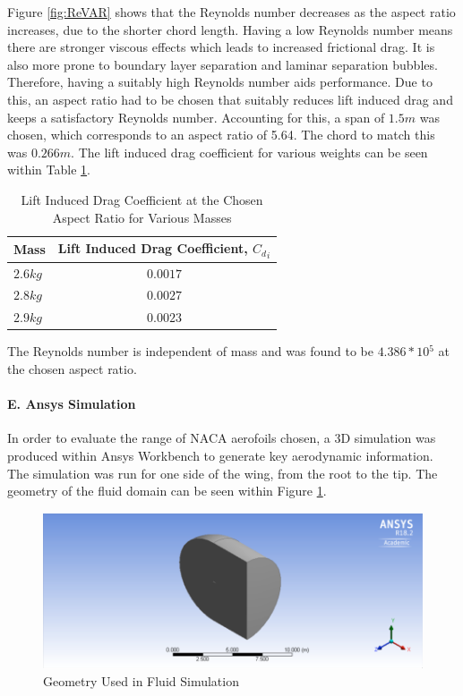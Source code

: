 \documentclass[12pt]{article}
\begin{document}
\noindent Figure \ref{fig:ReVAR} shows that the Reynolds number decreases as the aspect ratio increases, due to the shorter chord length. Having a low Reynolds number means there are stronger viscous effects which leads to increased frictional drag. It is also more prone to boundary layer separation and laminar separation bubbles. Therefore, having a suitably high Reynolds number aids performance. Due to this, an aspect ratio had to be chosen that suitably reduces lift induced drag and keeps a satisfactory Reynolds number. Accounting for this, a span of $1.5m$ was chosen, which corresponds to an aspect ratio of 5.64. The chord to match this was $0.266m$. The lift induced drag coefficient for various weights can be seen within Table \ref{table:indrc}. \\

\begin{table}[h]
    \centering
    \begin{tabular}{|l|c|}
        \hline
        \textbf{Mass} & \textbf{Lift Induced Drag Coefficient, $C{{_d}_i}$} \\
        \hline 
        $2.6kg$ & $0.0017$ \\
        \hline 
        $2.8kg$ & $0.0027$ \\
        \hline 
        $2.9kg$ & $0.0023$ \\
        \hline
    \end{tabular}
    \caption{Lift Induced Drag Coefficient at the Chosen Aspect Ratio for Various Masses}
    \label{table:indrc}
\end{table}

\noindent The Reynolds number is independent of mass and was found to be $4.386*10{^5}$ at the chosen aspect ratio. \\

\paragraph{E. Ansys Simulation} In order to evaluate the range of NACA aerofoils chosen, a 3D simulation was produced within Ansys Workbench to generate key aerodynamic information. The simulation was run for one side of the wing, from the root to the tip. The geometry of the fluid domain can be seen within Figure \ref{fig:cfdgeom}. \\

\begin{figure}[H]
\includegraphics[width=18cm, scale=1]{cfdgeometry.png}
\centering
\caption{Geometry Used in Fluid Simulation}
\label{fig:cfdgeom}
\end{figure}
\end{document}

